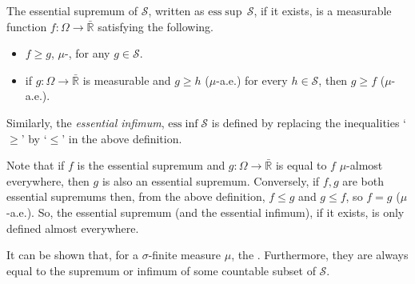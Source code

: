 \documentclass[12pt]{article}
\newcommand{\esssup}{{\mathrm{ess}\sup}}
\newcommand{\essinf}{{\mathrm{ess}\inf}}
\begin{document}
The essential supremum of $\mathcal{S}$, written as $\esssup\,\mathcal{S}$, if it exists, is a measurable function $f\colon\Omega\rightarrow\mathbb{\bar R}$ satisfying the following.
\begin{itemize}
\item $f\ge g$, $\mu$-, for any $g\in\mathcal{S}$.
\item if $g\colon\Omega\rightarrow\mathbb{\bar R}$ is measurable and $g\ge h$ ($\mu$-a.e.) for every $h\in\mathcal{S}$, then $g\ge f$ ($\mu$-a.e.).
\end{itemize}
Similarly, the \emph{essential infimum}, $\essinf\mathcal{S}$ is defined by replacing the inequalities `$\ge$' by `$\le$' in the above definition.

Note that if $f$ is the essential supremum and $g\colon\Omega\rightarrow\mathbb{\bar R}$ is equal to $f$ $\mu$-almost everywhere, then $g$ is also an essential supremum. Conversely, if $f,g$ are both essential supremums then, from the above definition, $f\le g$ and $g\le f$, so $f=g$ ($\mu$-a.e.). So, the essential supremum (and the essential infimum), if it exists, is only defined almost everywhere.

It can be shown that, for a $\sigma$-finite measure $\mu$, the . Furthermore, they are always equal to the supremum or infimum of some countable subset of $\mathcal{S}$.

\end{document}
